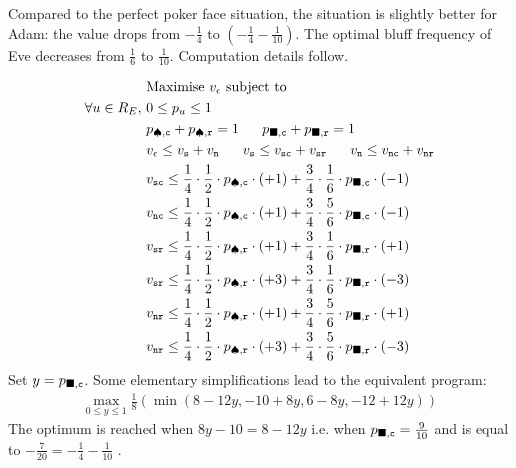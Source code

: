 Compared to the perfect poker face situation,
 the situation is slightly better for Adam:
 the value drops from $-\frac{1}{4}$
to $(-\frac{1}{4} -\frac{1}{10})$.
The optimal bluff frequency of Eve decreases
 from $\frac{1}{6}$ to $\frac{1}{10}$.
Computation details follow.

\begin{align*}
&\text{Maximise $v_{\epsilon}$ subject to}
\\
\forall u \in R_E,~& 0\leq p_u \leq 1\\
&p_{\spadesuit,{\tt c} } +  p_{\spadesuit,{\tt r} } = 1~~~~~p_{\blacksquare,{\tt c} } +  p_{\blacksquare,{\tt r} } = 1\\
&v_\epsilon \leq v_{\tt s} + v_{\tt n}~~~~~v_{\tt s} \leq v_{{\tt sc}} + v_{{\tt sr}}~~~~~
 v_{\tt n} \leq v_{{\tt nc}} + v_{{\tt nr}}\\
&v_{{\tt sc} } \leq 
 \frac{1}{4}\cdot\frac{1}{2} \cdot p_{\spadesuit,{\tt c} } \cdot (+1) 
+ \frac{3}{4}\cdot \frac{1}{6} \cdot p_{\blacksquare,{\tt c} } \cdot (-1)\\
&v_{{\tt nc} } \leq 
 \frac{1}{4}\cdot\frac{1}{2} \cdot p_{\spadesuit,{\tt c} } \cdot (+1) 
+ \frac{3}{4} \cdot\frac{5}{6} \cdot p_{\blacksquare,{\tt c} } \cdot (-1)\\
&v_{{\tt sr}} \leq \frac{1}{4}\cdot \frac{1}{2}\cdot p_{\spadesuit,{\tt r} } \cdot (+1) 
+ \frac{3}{4} \cdot\frac{1}{6}\cdot p_{\blacksquare,{\tt r} } \cdot (+1)\\
&v_{{\tt sr}} \leq \frac{1}{4}\cdot \frac{1}{2}\cdot p_{\spadesuit,{\tt r} } \cdot (+3) 
+ \frac{3}{4} \cdot\frac{1}{6}\cdot p_{\blacksquare,{\tt r} } \cdot (-3)\\
&v_{{\tt nr}} \leq \frac{1}{4}\cdot \frac{1}{2}\cdot p_{\spadesuit,{\tt r} } \cdot (+1) 
+ \frac{3}{4} \cdot\frac{5}{6}\cdot p_{\blacksquare,{\tt r} } \cdot (+1)\\
&v_{{\tt nr}} \leq \frac{1}{4}\cdot \frac{1}{2}\cdot p_{\spadesuit,{\tt r} } \cdot (+3) 
+ \frac{3}{4} \cdot\frac{5}{6}\cdot p_{\blacksquare,{\tt r} } \cdot (-3)
\end{align*}
Set $y=p_{\blacksquare,{\tt c} }$.
Some elementary simplifications lead to the equivalent program:
\begin{align*}
\max_{0\leq y \leq 1} \frac{1}{8} \left(\min\left( 8 -12y,-10 +8y
,  6  - 8y,-12  +12y \right) \right) 
\end{align*}
The optimum is reached when $8y-10=8-12y$
i.e. when $p_{\blacksquare,{\tt c} }=\frac{9}{10}$
and is equal to $-\frac{7}{20}=-\frac{1}{4}-\frac{1}{10}$ .


